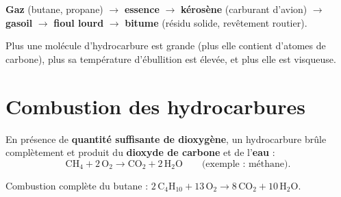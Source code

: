 \begin{illus}
\end{illus}

\begin{propriete}
\textbf{Gaz} (butane, propane) $\to$ \textbf{essence} $\to$ \textbf{kérosène}
(carburant d'avion) $\to$ \textbf{gasoil} $\to$ \textbf{fioul lourd} $\to$
\textbf{bitume} (résidu solide, revêtement routier).
\end{propriete}

\begin{remarque}
Plus une molécule d'hydrocarbure est grande (plus elle contient d'atomes de carbone),
plus sa température d'ébullition est élevée, et plus elle est visqueuse.
\end{remarque}

\section{Combustion des hydrocarbures}

\begin{propriete}
En présence de \textbf{quantité suffisante de dioxygène}, un hydrocarbure brûle
complètement et produit du \textbf{dioxyde de carbone} et de l'\textbf{eau} :
\[
\mathrm{CH_4 + 2\,O_2 \longrightarrow CO_2 + 2\,H_2O} \qquad\text{(exemple : méthane).}
\]
\end{propriete}

\begin{exemple}
Combustion complète du butane : $\mathrm{2\,C_4H_{10} + 13\,O_2 \longrightarrow
8\,CO_2 + 10\,H_2O}$.
\end{exemple}

